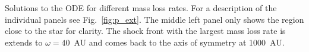 \label{fig:dot_m}
Solutions to the ODE for different mass loss rates. For a description of the individual panels see Fig.~\ref{fig:p_ext}. The middle left panel only shows the region close to the star for clarity. The shock front with the largest mass loss rate is extends to $\omega=40$~AU and comes back to the axis of symmetry at 1000~AU.